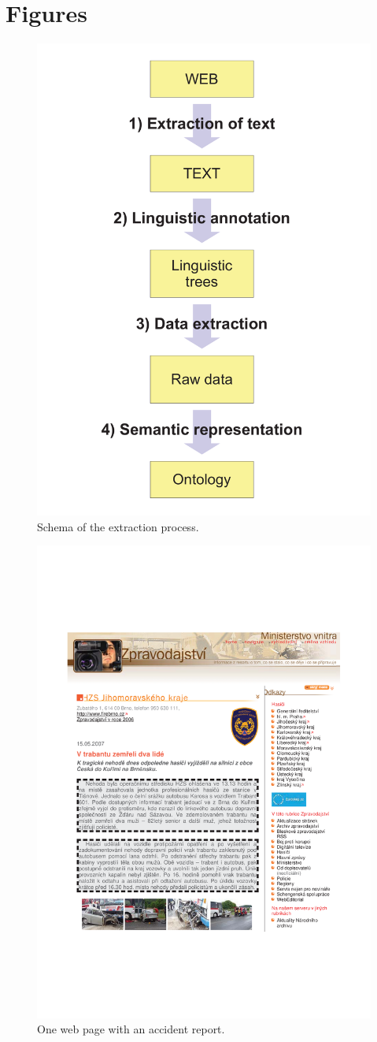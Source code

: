 \section{Figures}



\begin{figure}
	\centering
		\includegraphics[width=0.2\hsize]{../img/ch3_ap_schema}
	\caption{Schema of the extraction process.}
	\label{fig:ch3_ap_schema}
\end{figure}


\begin{figure}
	\centering
		\includegraphics[width=0.5\hsize]{../img/ch3_article}
	\caption{One web page with an accident report.}
	\label{fig:ch3_article}
\end{figure}


